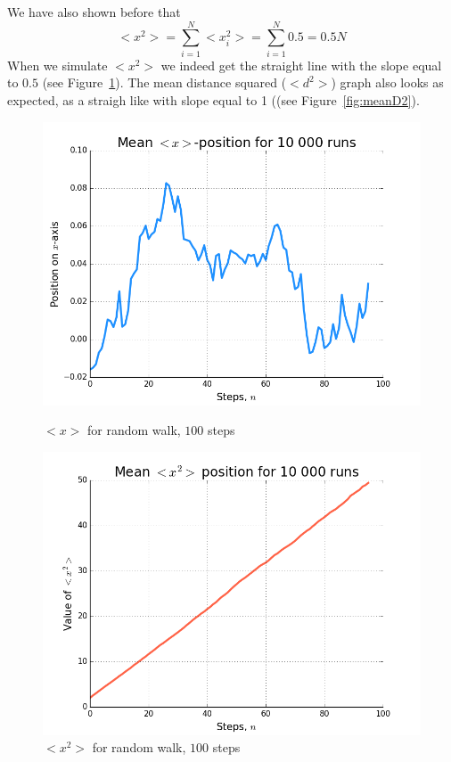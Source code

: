 \documentclass[12pt]{article}
\begin{document}
We have also shown before that
\begin{equation}
    <x^2>=\sum_{i=1}^N <x_i^2>=\sum_{i=1}^N 0.5=0.5N
\end{equation}
When we simulate $<x^2>$ we indeed get the straight line with the slope equal to $0.5$ (see Figure~\ref{fig:meanX2}). 
The mean distance squared ($<d^2>$) graph also looks as expected, as a straigh like with slope equal to 1 ((see Figure~\ref{fig:meanD2}).

\begin{figure}[!htb]
  \includegraphics[width=\linewidth]{meanX.png}
  \caption{$<x>$ for random walk, $100$ steps}\label{fig:meanX}
\endminipage\hfill
{}
  \includegraphics[width=\linewidth]{meanX2.png}
  \caption{$<x^2>$ for random walk, $100$ steps}\label{fig:meanX2}
\endminipage\hfill
\end{figure}
\end{document}
